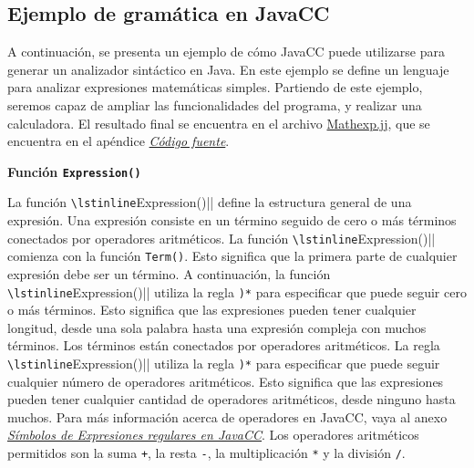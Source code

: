 


\subsection{Ejemplo de gramática en JavaCC}
\noindent A continuación, se presenta un ejemplo de cómo JavaCC puede utilizarse para generar un analizador sintáctico en Java. En este ejemplo se define un lenguaje para analizar expresiones matemáticas simples. Partiendo de este ejemplo, seremos capaz de ampliar las funcionalidades del programa, y realizar una calculadora. El resultado final se encuentra en el archivo \hyperref[sec:mathexp]{Mathexp.jj}, que se encuentra en el apéndice \hyperref[sec:codigofuente]{\textit{Código fuente}}.

\phantom{text}

\noindent \textbf{Función \lstinline|Expression()|}

\phantom{text}

\lstset{inputencoding=utf8/latin1}


\noindent La función \lstinline|\lstinline|Expression()|| define la estructura general de una expresión. Una expresión consiste en un término seguido de cero o más términos conectados por operadores aritméticos. La función \lstinline|\lstinline|Expression()|| comienza con la función \lstinline|Term()|. Esto significa que la primera parte de cualquier expresión debe ser un término. A continuación, la función \lstinline|\lstinline|Expression()|| utiliza la regla \lstinline|)*| para especificar que puede seguir cero o más términos. Esto significa que las expresiones pueden tener cualquier longitud, desde una sola palabra hasta una expresión compleja con muchos términos.
Los términos están conectados por operadores aritméticos. La regla \lstinline|\lstinline|Expression()|| utiliza la regla \lstinline|)*| para especificar que puede seguir cualquier número de operadores aritméticos. Esto significa que las expresiones pueden tener cualquier cantidad de operadores aritméticos, desde ninguno hasta muchos. Para más información acerca de operadores en JavaCC, vaya al anexo \hyperref[sec:simbolosdeexpresionesregulares]{\textit{Símbolos de Expresiones regulares en JavaCC}}.
Los operadores aritméticos permitidos son la suma \lstinline|+|, la resta \lstinline|-|, la multiplicación \lstinline|*| y la división \lstinline|/|.

